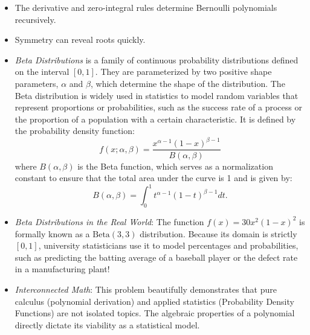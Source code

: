 \begin{takeaways}
\begin{itemize}[leftmargin=*]
\item The derivative and zero-integral rules determine Bernoulli polynomials recursively.
\item Symmetry can reveal roots quickly.
\item \textit{Beta Distributions} is a family of continuous probability distributions defined on the interval $[0, 1]$. They are parameterized by two positive shape parameters, $\alpha$ and $\beta$, which determine the shape of the distribution. The Beta distribution is widely used in statistics to model random variables that represent proportions or probabilities, such as the success rate of a process or the proportion of a population with a certain characteristic. It is defined by the probability density function:
\[f(x; \alpha, \beta) = \frac{x^{\alpha - 1}(1 - x)^{\beta - 1}}{B(\alpha, \beta)}\]
where $B(\alpha, \beta)$ is the Beta function, which serves as a normalization constant to ensure that the total area under the curve is 1 and is given by:
\[B(\alpha, \beta) = \int_0^1 t^{\alpha - 1}(1 - t)^{\beta - 1} dt.\]
\item \textit{Beta Distributions in the Real World}: The function $f(x) = 30x^2(1-x)^2$ is formally known as a $\text{Beta}(3,3)$ distribution. Because its domain is strictly $[0,1]$, university statisticians use it to model percentages and probabilities, such as predicting the batting average of a baseball player or the defect rate in a manufacturing plant!
\item \textit{Interconnected Math}: This problem beautifully demonstrates that pure calculus (polynomial derivation) and applied statistics (Probability Density Functions) are not isolated topics. The algebraic properties of a polynomial directly dictate its viability as a statistical model.

\end{itemize}
\end{takeaways}

